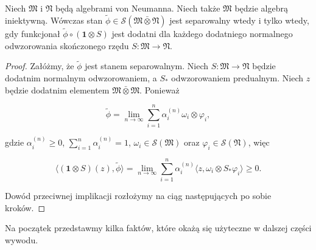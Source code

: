 \begin{Theorem}
    \label{thm:PHcrit}
    Niech $\mathfrak{M}$ i  $\mathfrak{N}$ będą algebrami von Neumanna.
    Niech także  $\mathfrak{M}$ będzie algebrą iniektywną.
    Wówczas stan $\tilde{\phi} \in \mathcal{S}(\mathfrak{M} \bar{\otimes} \mathfrak{N})$
    jest separowalny wtedy i tylko wtedy, gdy funkcjonał
    $\tilde{\phi} \circ (\mathbf{1} \otimes S)$
    jest dodatni dla każdego dodatniego normalnego odwzorowania skończonego rzędu
    $S\!: \mathfrak{M} \rightarrow \mathfrak{N}$.
\end{Theorem}

\begin{proof}
Załóżmy, że $\tilde{\phi}$ jest stanem separowalnym.
Niech $S: \mathfrak{M} \rightarrow \mathfrak{N}$ będzie
dodatnim normalnym odwzorowaniem, a $S_*$ odwzorowaniem predualnym.
Niech $z$ będzie dodatnim elementem
$\mathfrak{M} \bar{\otimes} \mathfrak{M}$.
Ponieważ
\begin{linenomath*}
 \begin{equation}
    \tilde{\phi} =\lim \limits_{n \rightarrow \infty}
\sum_{i=1}^{n}\alpha_i^{(n)} \omega_{i} \otimes \varphi_{i},
 \end{equation}
\end{linenomath*}
gdzie
$\alpha_i^{(n)}\geq 0$, $\sum_{i=1}^n\alpha_i^{(n)}=1$,
$\omega_{i}\in\mathcal{S}(\mathfrak{M})$
oraz
$\varphi_{i}\in\mathcal{S}(\mathfrak{N})$,
więc
\begin{linenomath*}
 \begin{equation}
 \langle (\mathbf{1} \otimes S)(z), \tilde{\phi} \rangle =
 \lim \limits_{n \rightarrow \infty}\sum \limits_{i = 1}^{n}\alpha_i^{(n)}
 \langle z, \omega_{i} \otimes S_{*} \varphi_{i} \rangle \geq 0.
 \end{equation}
\end{linenomath*}
Dowód przeciwnej implikacji rozłożymy na ciąg następujących po sobie kroków.
\end{proof}

Na początek przedstawmy kilka faktów, które okażą się użyteczne w dalszej
części wywodu.

